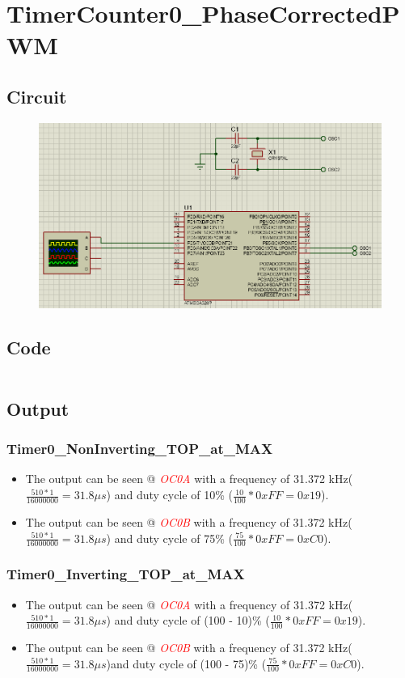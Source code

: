 \documentclass[oneside]{book}
\newcommand{\pinFormat}[1]{\emph{\textcolor{red}{#1}}}
\begin{document}
\section{TimerCounter0\_PhaseCorrectedPWM}
\subsection{Circuit}
\begin{figure}[H]
    \centering
    \includegraphics[height=0.2\textheight]{TimerCounter0_PhaseCorrectedPWM.png}
\end{figure}
\subsection{Code}
\inputminted[breaklines, bgcolor=black]{c}{../programFiles/TimerCounter0_PhaseCorrectedPWM.c}
\subsection{Output}
\subsubsection{Timer0\_NonInverting\_TOP\_at\_MAX}
\begin{itemize}
    \item The output can be seen @ \pinFormat{OC0A} with a frequency of 31.372 kHz($\frac{510 * 1}{16000000} = 31.8\mu s$) and duty cycle of 10\% ($\frac{10}{100} * 0xFF = 0x19$).
    \item The output can be seen @ \pinFormat{OC0B} with a frequency of 31.372 kHz($\frac{510 * 1}{16000000} = 31.8\mu s$) and duty cycle of 75\% ($\frac{75}{100} * 0xFF = 0xC0$).
\end{itemize}
\subsubsection{Timer0\_Inverting\_TOP\_at\_MAX}
\begin{itemize}
    \item The output can be seen @ \pinFormat{OC0A} with a frequency of 31.372 kHz($\frac{510 * 1}{16000000} = 31.8\mu s$) and duty cycle of (100 - 10)\% ($\frac{10}{100} * 0xFF = 0x19$).
    \item The output can be seen @ \pinFormat{OC0B} with a frequency of 31.372 kHz($\frac{510 * 1}{16000000} = 31.8\mu s$)and duty cycle of (100 - 75)\% ($\frac{75}{100} * 0xFF = 0xC0$).
\end{itemize}
\end{document}
